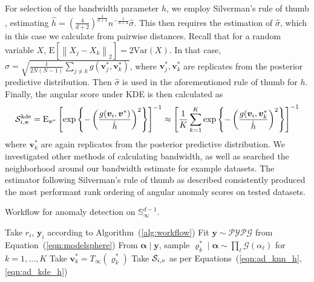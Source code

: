 For selection of the bandwidth parameter $h$, we employ Silverman's rule of
    thumb \citep{silverman2018}, estimating 
    $\hat{h} = \left(\frac{4}{d+2}\right)^{\frac{1}{d+4}}
        n^{-\frac{1}{d+4}}\hat{\sigma}$.
    This then requires the estimation of $\hat{\sigma}$, which in this case we
    calculate from pairwise distances.  Recall that for a random variable $X$,
    $\text{E}\left[\left\lVert X_j - X_k\right\rVert_2\right] 
        = 2\text{Var}(X)$.
    In that case, $\hat{\sigma} = 
        \sqrt{\frac{1}{2N(N-1)}\sum_{j\neq k}g(\bm{v}_j^*,\bm{v}_k^*)}$, where
    $\bm{v}_j^*,\bm{v}_k^*$ are replicates from the posterior predictive distribution.
    Then $\hat{\sigma}$ is used in the aforementioned rule of thumb for $h$.
    Finally, the angular score under KDE is then calculated as
    \begin{equation}
    \label{eqn:ad_kde_h}
    \mathcal{S}_{i,\bm{v}}^{\text{kde}} = \text{E}_{\bm{v}^*}\left[\exp\left\lbrace -
    \left(\frac{g(\bm{v}_i,\bm{v}^*)}{\hat{h}}\right)^2\right\rbrace\right]^{-1}
    \approx
    \left[\frac{1}{K}\sum_{k = 1}^{K}
    \exp\left\lbrace-\left(\frac{g(\bm{v}_i,\bm{v}_k^*}{\hat{h}}\right)^2\right\rbrace\right]^{-1}
    \end{equation}
    where $\bm{v}_k^*$ are again replicates from the posterior predictive distribution.
    We investigated other methods of calculating bandwidth, as well as searched
    the neighborhood around our bandwidth estimate for example datasets.
    The estimator following Silverman's rule of thumb as described consistently 
    produced the most performant rank ordering of angular anomaly scores on 
    tested datasets.

\begin{algorithm}[htb]
    \caption{Workflow for anomaly detection on $\mathbb{S}_{\infty}^{d-1}$.}\label{alg:adreal}
    \begin{algorithmic}[1]
        \State Take $r_i$, $\bm{y}_i$ according to Algorithm~(\ref{alg:workflow})
        \State Fit $\bm{y}\sim\mathcal{PYPG}$ from Equation~(\ref{eqn:modelsphere})
        \State From $\bm{\alpha}\mid\bm{y}$, sample
            $\bm{\varrho}_k^{*}\mid\bm{\alpha}\sim\prod_{\ell}\mathcal{G}(\alpha_{\ell})$ for $k = 1,\ldots,K$
        \State Take $\bm{v}_k^{*} = T_{\infty}(\bm{\varrho}_k^{*})$
        \State Take $\mathcal{S}_{i,v}$ as per Equations~(\ref{eqn:ad_knn_h},\ref{eqn:ad_kde_h})
    \end{algorithmic}
\end{algorithm}

